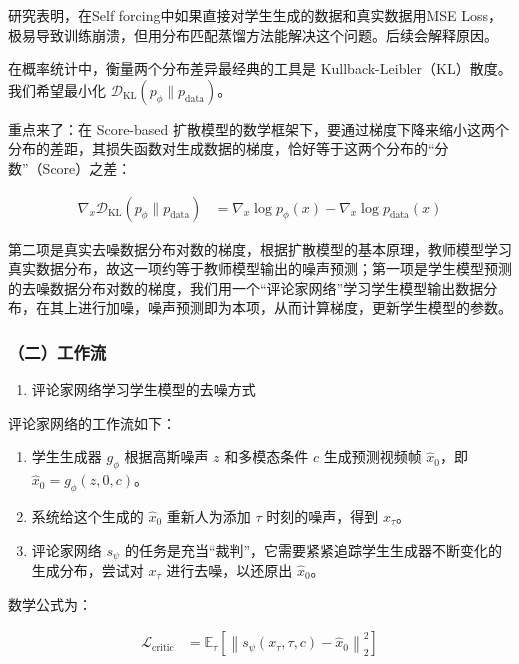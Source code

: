 研究表明，在Self forcing中如果直接对学生生成的数据和真实数据用MSE Loss，极易导致训练崩溃，但用分布匹配蒸馏方法能解决这个问题。后续会解释原因。

在概率统计中，衡量两个分布差异最经典的工具是 Kullback-Leibler（KL）散度。我们希望最小化 \(\mathcal{D}_{\mathrm{KL}}(p_\phi\|p_{\mathrm{data}})\)。

重点来了：在 Score-based 扩散模型的数学框架下，要通过梯度下降来缩小这两个分布的差距，其损失函数对生成数据的梯度，恰好等于这两个分布的``分数''（Score）之差：

\[
\begin{aligned}
\nabla_x\mathcal{D}_{\mathrm{KL}}(p_\phi\|p_{\mathrm{data}})
&=\nabla_x\log p_\phi(x)-\nabla_x\log p_{\mathrm{data}}(x)
\end{aligned}
\]

第二项是真实去噪数据分布对数的梯度，根据扩散模型的基本原理，教师模型学习真实数据分布，故这一项约等于教师模型输出的噪声预测；第一项是学生模型预测的去噪数据分布对数的梯度，我们用一个``评论家网络''学习学生模型输出数据分布，在其上进行加噪，噪声预测即为本项，从而计算梯度，更新学生模型的参数。

\hypertarget{ux4e8cux5de5ux4f5cux6d41-3}{%
\subsubsection{（二）工作流}\label{ux4e8cux5de5ux4f5cux6d41-3}}

\begin{enumerate}
\def\labelenumi{\arabic{enumi}.}
\tightlist
\item
  评论家网络学习学生模型的去噪方式
\end{enumerate}

评论家网络的工作流如下：

\begin{enumerate}
\def\labelenumi{\arabic{enumi}.}
\tightlist
\item
  学生生成器 \(g_\phi\) 根据高斯噪声 \(z\) 和多模态条件 \(c\) 生成预测视频帧 \(\hat{x}_0\)，即 \(\hat{x}_0=g_\phi(z,0,c)\)。
\item
  系统给这个生成的 \(\hat{x}_0\) 重新人为添加 \(\tau\) 时刻的噪声，得到 \(x_\tau\)。
\item
  评论家网络 \(s_\psi\) 的任务是充当``裁判''，它需要紧紧追踪学生生成器不断变化的生成分布，尝试对 \(x_\tau\) 进行去噪，以还原出 \(\hat{x}_0\)。
\end{enumerate}

数学公式为：

\[
\begin{aligned}
\mathcal{L}_{\mathrm{critic}}
&=\mathbb{E}_{\tau}\left[\left\|s_\psi(x_\tau,\tau,c)-\hat{x}_0\right\|_2^2\right]
\end{aligned}
\]


